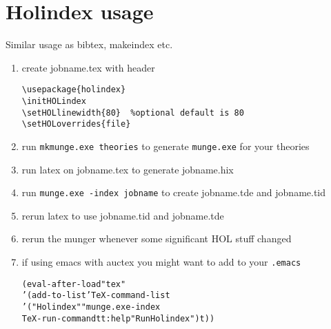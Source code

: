 \documentclass{article}
\begin{document}
\section{Holindex usage}

Similar usage as bibtex, makeindex etc.

\begin{enumerate}
\item create jobname.tex with header
\begin{verbatim}
\usepackage{holindex}
\initHOLindex
\setHOLlinewidth{80}  %optional default is 80
\setHOLoverrides{file}
\end{verbatim}
\item run \texttt{mkmunge.exe theories} to generate \texttt{munge.exe} for your theories
\item run latex on jobname.tex to generate jobname.hix
\item run \texttt{munge.exe -index jobname} to create jobname.tde and jobname.tid
\item rerun latex to use jobname.tid and jobname.tde
\item rerun the munger whenever some significant HOL stuff changed
\item if using emacs with auctex you might want to add to your \texttt{.emacs}
\begin{alltt}
(eval-after-load "tex"
  '(add-to-list 'TeX-command-list
    '("Holindex" "munge.exe -index %s" 
       TeX-run-command t t :help "Run Holindex") t))
\end{alltt}
\end{enumerate}
\end{document}
